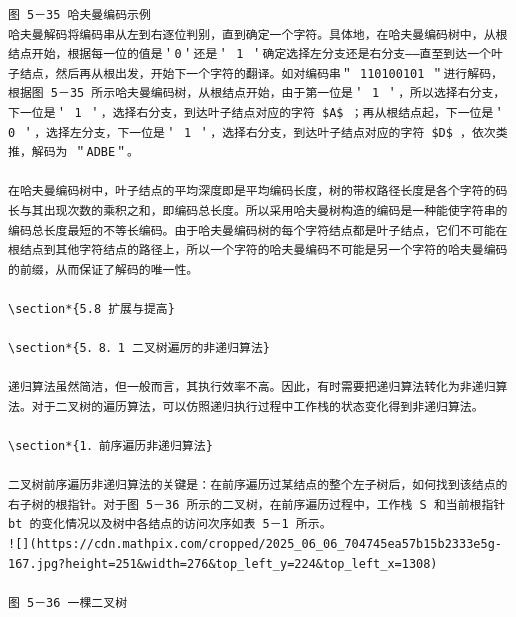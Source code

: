 \documentclass[10pt]{article}
\begin{document}
\begin{verbatim}
图 5－35 哈夫曼编码示例
哈夫曼解码将编码串从左到右逐位判别，直到确定一个字符。具体地，在哈夫曼编码树中，从根结点开始，根据每一位的值是＇0＇还是＇ 1 ＇确定选择左分支还是右分支——直至到达一个叶子结点，然后再从根出发，开始下一个字符的翻译。如对编码串＂ 110100101 ＂进行解码，根据图 5－35 所示哈夫曼编码树，从根结点开始，由于第一位是＇ 1 ＇，所以选择右分支，下一位是＇ 1 ＇，选择右分支，到达叶子结点对应的字符 $A$ ；再从根结点起，下一位是＇ 0 ＇，选择左分支，下一位是＇ 1 ＇，选择右分支，到达叶子结点对应的字符 $D$ ，依次类推，解码为 ＂ADBE＂。

在哈夫曼编码树中，叶子结点的平均深度即是平均编码长度，树的带权路径长度是各个字符的码长与其出现次数的乘积之和，即编码总长度。所以采用哈夫曼树构造的编码是一种能使字符串的编码总长度最短的不等长编码。由于哈夫曼编码树的每个字符结点都是叶子结点，它们不可能在根结点到其他字符结点的路径上，所以一个字符的哈夫曼编码不可能是另一个字符的哈夫曼编码的前缀，从而保证了解码的唯一性。

\section*{5.8 扩展与提高}

\section*{5．8．1 二叉树遍厉的非递归算法}

递归算法虽然简洁，但一般而言，其执行效率不高。因此，有时需要把递归算法转化为非递归算法。对于二叉树的遍历算法，可以仿照递归执行过程中工作栈的状态变化得到非递归算法。

\section*{1．前序遍历非递归算法}

二叉树前序遍历非递归算法的关键是：在前序遍历过某结点的整个左子树后，如何找到该结点的右子树的根指针。对于图 5－36 所示的二叉树，在前序遍历过程中，工作栈 S 和当前根指针 bt 的变化情况以及树中各结点的访问次序如表 5－1 所示。
![](https://cdn.mathpix.com/cropped/2025_06_06_704745ea57b15b2333e5g-167.jpg?height=251&width=276&top_left_y=224&top_left_x=1308)

图 5－36 一棵二叉树


\end{verbatim}
\end{document}

